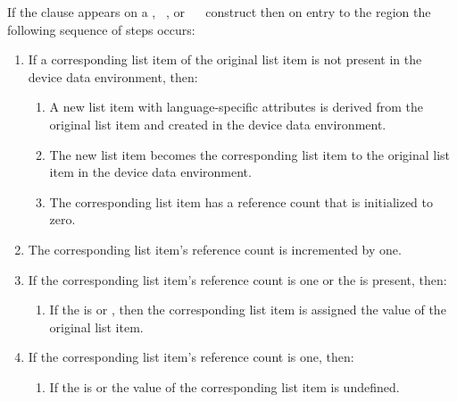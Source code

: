 If the  clause appears on a , ~, or ~~ construct then on entry to the region the following sequence of steps occurs:
\begin{enumerate}
\item If a corresponding list item of the original list item is not present in the device data environment, then:
\begin{enumerate}
\item A new list item with language-specific attributes is derived from the original list item and created in the device data environment.
\item The new list item becomes the corresponding list item to the original list item in the device data environment.
\item The corresponding list item has a reference count that is initialized to zero. 
\end{enumerate}
\item The corresponding list item's reference count is incremented by one.
\item If the corresponding list item's reference count is one or the   is present, then:
\begin{enumerate}
\item If the  is  or , then the corresponding list item is assigned the value of the original list item. 
\end{enumerate}
\item If the corresponding list item's reference count is one, then:
\begin{enumerate}
\item If the  is  or  the value of the corresponding list item is undefined. 
\end{enumerate}
\end{enumerate}

